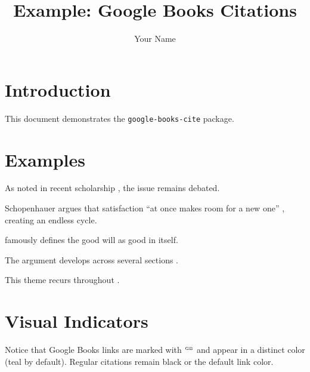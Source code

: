 \documentclass{article}
\title{Example: Google Books Citations}
\author{Your Name}
\begin{document}
\maketitle

\section{Introduction}

This document demonstrates the \texttt{google-books-cite} package.
\gbdisclaimer  %

\section{Examples}

As noted in recent scholarship \parencite[p.~42]{ModernWork2020}, the issue remains debated.

Schopenhauer argues that satisfaction ``at once makes room for a new one'' 
, creating an endless cycle.

 famously defines the good will as good in itself.

The argument develops across several sections 
.

This theme recurs throughout .

\section{Visual Indicators}

Notice that Google Books links are marked with $^{\text{\tiny GB}}$ and 
appear in a distinct color (teal by default). Regular citations remain 
black or the default link color.

\printbibliography
\end{document}
